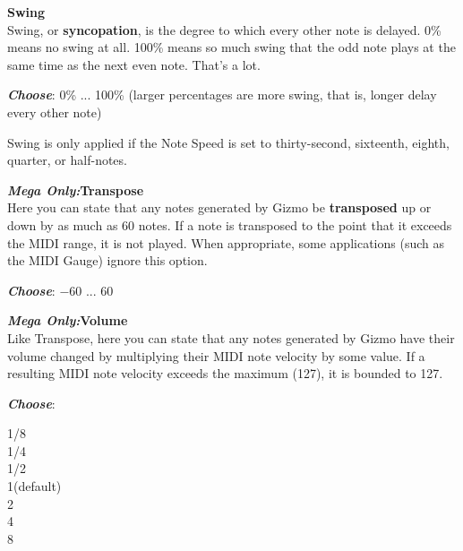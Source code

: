 \documentclass{article}
\begin{document}
\begin{description}
	\item{\bf Swing}\\
			Swing, or {\bf syncopation}, is the degree to which every other note is delayed.  0\% means no swing at all.  100\% means so much swing that the odd note plays at the same time as the next even note.  That's a lot.
		\begin{description}
		\item{\bf \textit{Choose}}: 0\% ... 100\% (larger percentages are more swing, that is, longer delay every other note)
		\end{description}

		Swing is only applied if the Note Speed is set to thirty-second, sixteenth, eighth, quarter, or half-notes.

	\item{\bf \textit{Mega Only:}\quad Transpose}\\
		Here you can state that any notes generated by Gizmo be {\bf transposed} up or down by as much as 60 notes. If a note is transposed to the point that it exceeds the MIDI range, it is not played.  When appropriate, some applications (such as the MIDI Gauge) ignore this option. 
		\begin{description}
		\item{\bf \textit{Choose}}: \(-60\) ... 60 
		\end{description}

	\item{\bf \textit{Mega Only:}\quad Volume}\\
		Like Transpose, here you can state that any notes generated by Gizmo have their volume changed by multiplying their MIDI note velocity by some value.  If a resulting MIDI note velocity exceeds the maximum (127), it is bounded to 127.
			
			\begin{description}
			\item{\bf \textit{Choose}}:
			\begin{tabbing}
			1/8\\
			1/4\\
			1/2\hspace{3.65in}\\
			1\qquad (default)\\
			2\\
			4\\
			8
			\end{tabbing}
		\end{description}


\end{description}
\end{document}
